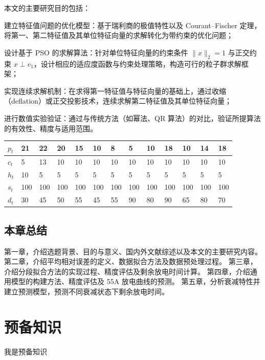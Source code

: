 本文的主要研究目的包括：

建立特征值问题的优化模型：基于瑞利商的极值特性以及 Courant--Fischer 定理，将第一、第二特征值及其单位特征向量的求解转化为带约束的优化问题；

设计基于 PSO 的求解算法：针对单位特征向量的约束条件 $\|x\|_2 = 1$ 与正交约束 $x \perp v_1$，设计相应的适应度函数与约束处理策略，构造可行的粒子群求解框架；

实现连续求解机制：在求得第一特征值与特征向量的基础上，通过收缩（deflation）或正交投影技术，连续求解第二特征值及其单位特征向量；

进行数值实验验证：通过与传统方法（如幂法、QR 算法）的对比，验证所提算法的有效性、精度与适用范围。

\begin{table}[!ht]
	\label{tab:lable}
	\begin{tabular*}{\hsize}{@{}@{\extracolsep{\fill}}lllllllllllll@{}}
		\toprule
		$p_{t}$  &21  &22  &20  &15  &10  &8   &5   &10  &18  &10  &14  &18\\
		\midrule
		$c_{t}$  &5   &13  &10  &10  &10  &10  &10  &10  &10  &10  &10  &10\\
		$h_{t}$  &10  &5   &5   &5   &5   &5   &5   &5   &5   &5   &5   &5 \\
		$s_{t}$  &100 &100 &100 &100 &100 &100 &100 &100 &100 &100 &100 &100\\
		$d_{t}$  &30  &45  &50  &55  &45  &55  &90  &80  &90  &65  &80  &70 \\
		\bottomrule
	\end{tabular*}
\end{table}

\section{本章总结}

第一章，介绍选题背景、目的与意义、国内外文献综述以及本文的主要研究内容。
第二章，介绍平均相对误差的定义、数据拟合方法及数据预处理过程。
第三章，介绍分段拟合方法的实现过程、精度评估及剩余放电时间计算。
第四章，介绍通用模型的构建方法、精度评估及 55A 放电曲线的预测。
第五章，分析衰减特性并建立预测模型，预测不同衰减状态下剩余放电时间。

\chapter{预备知识}
我是预备知识

